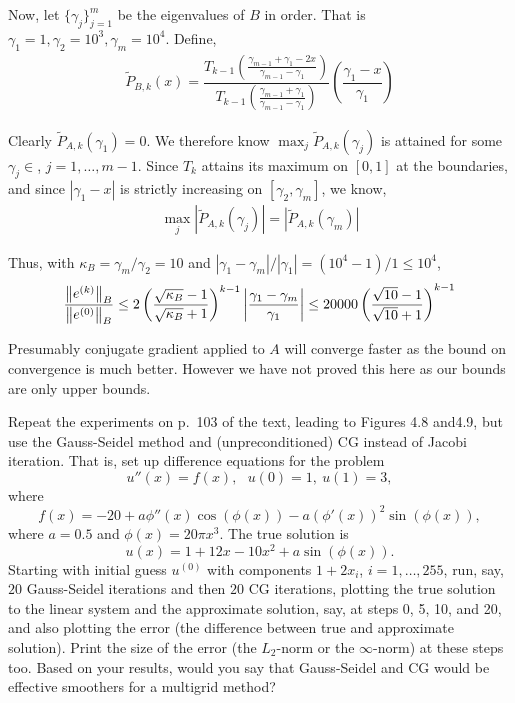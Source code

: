 \documentclass[10pt]{article}
\begin{document}
\begin{solution}[Solution]
Now, let \( \{\gamma_j\}_{j=1}^{m} \) be the eigenvalues of \( B \) in order. That is \( \gamma_1 = 1, \gamma_{2} = 10^3, \gamma_m = 10^4 \).
Define,
\begin{align*}
    \tilde{P}_{B,k}(x) = \dfrac{T_{k-1} \left( \frac{\gamma_{m-1}+\gamma_1-2x}{\gamma_{m-1}-\gamma_1} \right)}{T_{k-1} \left( \frac{\gamma_{m-1}+\gamma_1}{\gamma_{m-1} - \gamma_1} \right)} \left( \dfrac{\gamma_1-x}{\gamma_1} \right)
\end{align*}

Clearly \( \tilde{P}_{A,k}(\gamma_1) = 0 \). We therefore know \( \max_{j}\tilde{P}_{A,k}(\gamma_j) \) is attained for some \( \gamma_j \in \), \( j=1,\ldots, m-1 \). Since \( T_k \) attains its maximum on \( [0,1] \) at the boundaries, and since \( |\gamma_1-x| \) is strictly increasing on \( [\gamma_2,\gamma_m] \), we know,
\begin{align*}
    \max_j |\tilde{P}_{A,k} (\gamma_j) | = | \tilde{P}_{A,k} (\gamma_{m}) | 
\end{align*}

Thus, with \( \kappa_B = \gamma_{m} / \gamma_2 = 10 \) and \( |\gamma_1-\gamma_m|/|\gamma_1| = (10^4-1)/1 \leq 10^4 \),
\begin{align*}
    \dfrac{\left\lVert e^{(k)}\right\rVert_B}{\left\lVert e^{(0)}\right\rVert_B} 
    \leq 2 \left( \dfrac{\sqrt{\kappa_B}-1}{\sqrt{\kappa_B}+1} \right)^{k-1} \left| \dfrac{\gamma_1-\gamma_{m}}{\gamma_1} \right|
    \leq 20000 \left( \dfrac{\sqrt{10}-1}{\sqrt{10}+1} \right)^{k-1}
\end{align*}

Presumably conjugate gradient applied to \( A \) will converge faster as the bound on convergence is much better. However we have not proved this here as our bounds are only upper bounds.


\end{solution}

\begin{problem}[Problem 3]
Repeat the experiments on p.~103 of the text, leading to Figures 4.8 and4.9, but use the Gauss-Seidel method and (unpreconditioned) CG instead of Jacobi iteration.  That is, set up difference equations for the problem
\[
u''(x) = f(x),~~~u(0) = 1 ,~u(1) = 3 ,
\]
where
\[
f(x) = -20 + a \phi'' (x) \cos( \phi (x)) - a ( \phi' (x) )^2 \sin ( \phi (x) ),
\]
where \( a = 0.5 \) and \( \phi (x) = 20 \pi x^3 \).  The true solution is
\[
u(x) = 1 + 12 x - 10 x^2 + a \sin ( \phi (x) ) .
\]
Starting with initial guess \( u^{(0)} \) with components \( 1 + 2 x_i \), \( i=1, \ldots , 255 \), run, say, \( 20 \) Gauss-Seidel iterations and then
\( 20 \) CG iterations, plotting the true solution to the linear system and the approximate solution, say, at steps 0, 5, 10, and 20, and 
also plotting the error (the difference between true and approximate solution).  Print the size of the error (the \( L_2 \)-norm or the \( \infty \)-norm) at these steps too.  Based on your results, would you say that Gauss-Seidel and CG would be effective smoothers for a multigrid method?
\end{problem}
\end{document}
